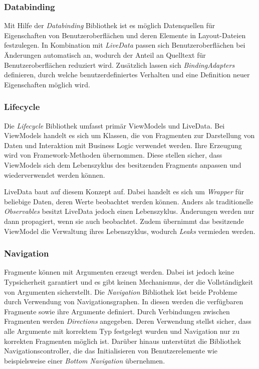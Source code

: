 \documentclass[a4paper, 11pt]{article}
\begin{document}
\subsubsection{Databinding}
\label{subsubsec:app:jetpack:databinding}
Mit Hilfe der \textit{Databinding} Bibliothek ist es möglich Datenquellen für Eigenschaften von Benutzeroberflächen und deren Elemente in Layout-Dateien festzulegen.
In Kombination mit \textit{LiveData} passen sich Benutzeroberflächen bei Änderungen automatisch an, wodurch der Anteil an Quelltext für Benutzeroberflächen reduziert wird.
Zusätzlich lassen sich \textit{BindingAdapters} definieren, durch welche benutzerdefiniertes Verhalten und eine Definition neuer Eigenschaften möglich wird.

\subsubsection{Lifecycle}
\label{subsubsec:app:jetpack:lifecycle}
Die \textit{Lifecycle} Bibliothek umfasst primär ViewModels und LiveData.
Bei ViewModels handelt es sich um Klassen, die von Fragmenten zur Darstellung von Daten und Interaktion mit Business Logic verwendet werden.
Ihre Erzeugung wird von Framework-Methoden übernommen.
Diese stellen sicher, dass ViewModels sich dem Lebenszyklus des besitzenden Fragments anpassen und wiederverwendet werden können.

LiveData baut auf diesem Konzept auf.
Dabei handelt es sich um \textit{Wrapper} für beliebige Daten, deren Werte beobachtet werden können.
Anders als traditionelle \textit{Observables} besitzt LiveData jedoch einen Lebenszyklus.
Änderungen werden nur dann propagiert, wenn sie auch beobachtet.
Zudem übernimmt das besitzende ViewModel die Verwaltung ihres Lebenszyklus, wodurch \textit{Leaks} vermieden werden.

\subsubsection{Navigation}
\label{subsubsec:app:jetpack:navigation}
Fragmente können mit Argumenten erzeugt werden.
Dabei ist jedoch keine Typsicherheit garantiert und es gibt keinen Mechanismus, der die Vollständigkeit von Argumenten sicherstellt.
Die \textit{Navigation} Bibliothek löst beide Probleme durch Verwendung von Navigationsgraphen.
In diesen werden die verfügbaren Fragmente sowie ihre Argumente definiert.
Durch Verbindungen zwischen Fragmenten werden \textit{Directions} angegeben.
Deren Verwendung stellst sicher, dass alle Argumente mit korrektem Typ festgelegt wurden und Navigation nur zu korrekten Fragmenten möglich ist.
Darüber hinaus unterstützt die Bibliothek Navigationscontroller, die das Initialisieren von Benutzerelemente wie beispielsweise einer \textit{Bottom Navigation} übernehmen. 
\end{document}
